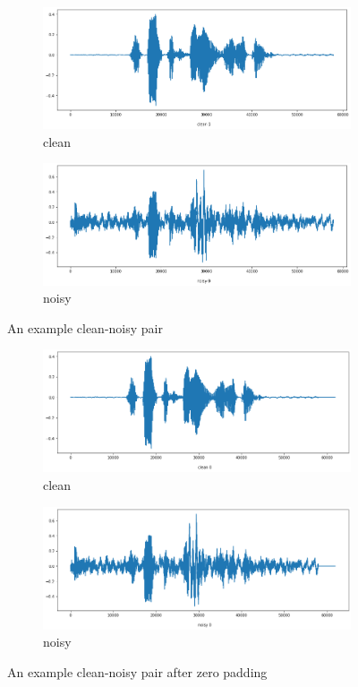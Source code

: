\documentclass{article}
\begin{document}
		
	\begin{figure}[H]
		\centering
		\begin{subfigure}{.5\textwidth}
			\centering
			\includegraphics[width=.8\linewidth]{wave_clean}
			\caption{clean}
			\label{fig:wave_clean}
		\end{subfigure}%
		\begin{subfigure}{.5\textwidth}
			\centering
			\includegraphics[width=.8\linewidth]{wave_noisy}
			\caption{noisy}
			\label{fig:wave_noisy}
		\end{subfigure}
		\caption{An example clean-noisy pair}
		\label{fig:test}
		
		\begin{subfigure}{.5\textwidth}
			\centering
			\includegraphics[width=.8\linewidth]{wave_clean_padded}
			\caption{clean}
			\label{fig:wave_clean_padded}
		\end{subfigure}%
		\begin{subfigure}{.5\textwidth}
			\centering
			\includegraphics[width=.8\linewidth]{wave_noisy_padded}
			\caption{noisy}
			\label{fig:wave_noisy_padded}
		\end{subfigure}
		\caption{An example clean-noisy pair after zero padding}
		\label{fig:test}
	\end{figure}
	\newpage
\end{document}
